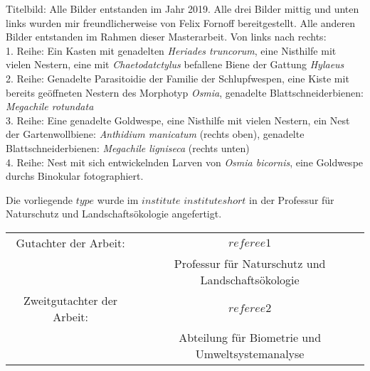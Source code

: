 \documentclass[a4paper,11pt]{article}
\newcommand{\thesistype}{$type$}
\begin{document}
\begin{scriptsize}
	Titelbild: Alle Bilder entstanden im Jahr 2019. Alle drei Bilder mittig und unten links wurden mir freundlicherweise von Felix Fornoff bereitgestellt. Alle anderen Bilder entstanden im Rahmen dieser Masterarbeit. Von links nach rechts:\\
	1. Reihe: Ein Kasten mit genadelten \textit{Heriades truncorum}, eine Nisthilfe mit vielen Nestern, eine mit \textit{Chaetodatctylus} befallene Biene der Gattung \textit{Hylaeus}\\
	2. Reihe: Genadelte Parasitoidie der Familie der Schlupfwespen, eine Kiste mit bereits geöffneten Nestern des Morphotyp \textit{Osmia}, genadelte Blattschneiderbienen: \textit{Megachile rotundata}\\
	3. Reihe: Eine genadelte Goldwespe, eine Nisthilfe mit vielen Nestern, ein Nest der Gartenwollbiene: \textit{Anthidium manicatum} (rechts oben), genadelte Blattschneiderbienen: \textit{Megachile ligniseca} (rechts unten)\\
	4. Reihe: Nest mit sich entwickelnden Larven von \textit{Osmia bicornis}, eine Goldwespe durchs Binokular fotographiert.\\
\end{scriptsize}
 

\vspace*{\fill}


Die vorliegende \thesistype{} wurde im $institute$ $instituteshort$ in der Professur für Naturschutz und Landschaftsökologie angefertigt. 




\vspace{3cm}

\begin{tabular}{ c c }
Gutachter der Arbeit:       &  $referee1$ \\
                            &  Professur für Naturschutz und Landschaftsökologie    \\
Zweitgutachter der Arbeit:  &  $referee2$ \\
                            &  Abteilung für Biometrie und Umweltsystemanalyse \\
\end{tabular}



\newpage


\pagebreak
\thispagestyle{empty}
\null
\newpage
\end{document}
